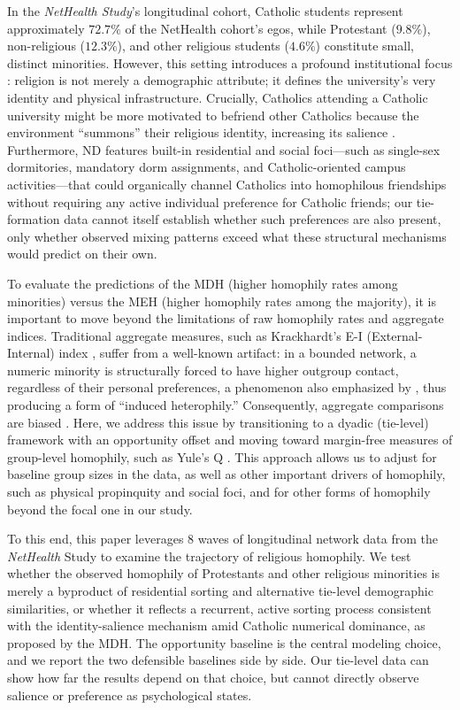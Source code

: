 \documentclass[11pt]{article}
\begin{document}
In the \textit{NetHealth Study}'s \citep{purta2016experiences-7de} longitudinal cohort, Catholic students represent approximately $72.7\%$ of the NetHealth cohort's egos, while Protestant ($9.8\%$), non-religious ($12.3\%$), and other religious students ($4.6\%$) constitute small, distinct minorities. However, this setting introduces a profound institutional focus \citep{feld1981, feld2009}: religion is not merely a demographic attribute; it defines the university's very identity and physical infrastructure. Crucially, Catholics attending a Catholic university might be more motivated to befriend other Catholics because the environment ``summons'' their religious identity, increasing its salience \citep{tavory2016}. Furthermore, ND features built-in residential and social foci---such as single-sex dormitories, mandatory dorm assignments, and Catholic-oriented campus activities---that could organically channel Catholics into homophilous friendships without requiring any active individual preference for Catholic friends; our tie-formation data cannot itself establish whether such preferences are also present, only whether observed mixing patterns exceed what these structural mechanisms would predict on their own.

To evaluate the predictions of the MDH (higher homophily rates among minorities) versus the MEH (higher homophily rates among the majority), it is important to move beyond the limitations of raw homophily rates and aggregate indices. Traditional aggregate measures, such as Krackhardt's E-I (External-Internal) index \citep{krackhardt1988informal-42d}, suffer from a well-known artifact: in a bounded network, a numeric minority is structurally forced to have higher outgroup contact, regardless of their personal preferences, a phenomenon also emphasized by \citet{blau1977}, thus producing a form of ``induced heterophily.'' Consequently, aggregate comparisons are biased \citep{everett2012categorical-592}. Here, we address this issue by transitioning to a dyadic (tie-level) framework with an opportunity offset and moving toward margin-free measures of group-level homophily, such as Yule's Q \citep{borgatti2024analyzing}. This approach allows us to adjust for baseline group sizes in the data, as well as other important drivers of homophily, such as physical propinquity and social foci, and for other forms of homophily beyond the focal one in our study. 

To this end, this paper leverages 8 waves of longitudinal network data from the \textit{NetHealth} Study to examine the trajectory of religious homophily. We test whether the observed homophily of Protestants and other religious minorities is merely a byproduct of residential sorting and alternative tie-level demographic similarities, or whether it reflects a recurrent, active sorting process consistent with the identity-salience mechanism amid Catholic numerical dominance, as proposed by the MDH. The opportunity baseline is the central modeling choice, and we report the two defensible baselines side by side. Our tie-level data can show how far the results depend on that choice, but cannot directly observe salience or preference as psychological states.
\end{document}

